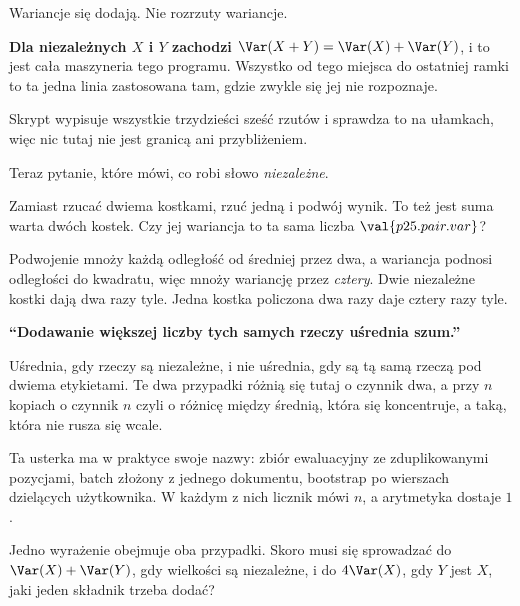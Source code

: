 \begin{fr}

Wariancje się dodają. Nie rozrzuty \dash{} wariancje.

\textbf{Dla niezależnych $X$ i $Y$ zachodzi $\Var(X + Y) = \Var(X) +
\Var(Y)$}, i to jest cała maszyneria tego programu. Wszystko od tego miejsca
do ostatniej ramki to ta jedna linia zastosowana tam, gdzie zwykle się jej
nie rozpoznaje.

Skrypt wypisuje wszystkie trzydzieści sześć rzutów i sprawdza to na ułamkach,
więc nic tutaj nie jest granicą ani przybliżeniem.
\end{fr}

\begin{fr}
Teraz pytanie, które mówi, co robi słowo \emph{niezależne}.

Zamiast rzucać dwiema kostkami, rzuć jedną i podwój wynik. To też jest suma
warta dwóch kostek. Czy jej wariancja to ta sama liczba
$\val{p25.pair.var}$?
\dotline
\nextframe
\end{fr}

\begin{fr}

Podwojenie mnoży każdą odległość od średniej przez dwa, a wariancja podnosi
odległości do kwadratu, więc mnoży wariancję przez \emph{cztery}. Dwie
niezależne kostki dają dwa razy tyle. Jedna kostka policzona dwa razy daje
cztery razy tyle.

\begin{trapbox}
\textbf{\enquote{Dodawanie większej liczby tych samych rzeczy uśrednia szum.}}

Uśrednia, gdy rzeczy są niezależne, i nie uśrednia, gdy są tą samą rzeczą pod
dwiema etykietami. Te dwa przypadki różnią się tutaj o czynnik dwa, a przy
$n$ kopiach o czynnik $n$ \dash{} czyli o różnicę między średnią, która się
koncentruje, a taką, która nie rusza się wcale.

Ta usterka ma w praktyce swoje nazwy: zbiór ewaluacyjny ze zduplikowanymi
pozycjami, batch złożony z jednego dokumentu, bootstrap po wierszach
dzielących użytkownika. W każdym z nich licznik mówi $n$, a arytmetyka
dostaje $1$.
\end{trapbox}

Jedno wyrażenie obejmuje oba przypadki. Skoro musi się sprowadzać do
$\Var(X) + \Var(Y)$, gdy wielkości są niezależne, i do $4\Var(X)$, gdy $Y$
jest $X$, jaki jeden składnik trzeba dodać?
\dotline
\nextframe
\end{fr}

